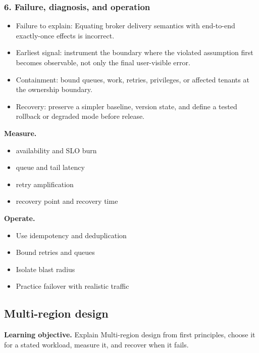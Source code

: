\subsubsection*{6. Failure, diagnosis, and operation}
\begin{itemize}
\item Failure to explain: Equating broker delivery semantics with end-to-end exactly-once effects is incorrect.
\item Earliest signal: instrument the boundary where the violated assumption first becomes observable, not only the final user-visible error.
\item Containment: bound queues, work, retries, privileges, or affected tenants at the ownership boundary.
\item Recovery: preserve a simpler baseline, version state, and define a tested rollback or degraded mode before release.
\end{itemize}
\textbf{Measure.}\begin{itemize}
\item availability and SLO burn
\item queue and tail latency
\item retry amplification
\item recovery point and recovery time
\end{itemize}
\textbf{Operate.}\begin{itemize}
\item Use idempotency and deduplication
\item Bound retries and queues
\item Isolate blast radius
\item Practice failover with realistic traffic
\end{itemize}
\subsection{Multi-region design}
\textbf{Learning objective.} Explain Multi-region design from first principles, choose it for a stated workload, measure it, and recover when it fails.
